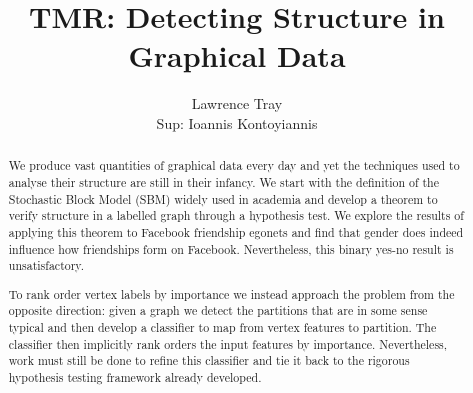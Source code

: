 \documentclass[11pt]{article}
\title{TMR: Detecting Structure in Graphical Data}
\author{Lawrence Tray \\ Sup: Ioannis Kontoyiannis}
\begin{document}
\maketitle

\begin{abstract}
We produce vast quantities of graphical data every day and yet the techniques used to analyse their structure are still in their infancy. We start with the definition of the Stochastic Block Model (SBM) widely used in academia and develop a theorem to verify structure in a labelled graph through a hypothesis test. We explore the results of applying this theorem to Facebook friendship egonets and find that gender does indeed influence how friendships form on Facebook. Nevertheless, this binary yes-no result is unsatisfactory.

To rank order vertex labels by importance we instead approach the problem from the opposite direction: given a graph we detect the partitions that are in some sense typical and then develop a classifier to map from vertex features to partition. The classifier then implicitly rank orders the input features by importance. Nevertheless, work must still be done to refine this classifier and tie it back to the rigorous hypothesis testing framework already developed.
\end{abstract}
\end{document}
